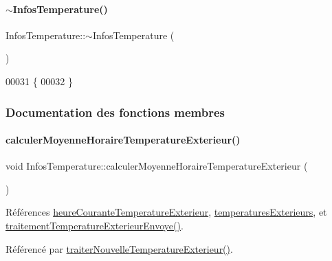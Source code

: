 \paragraph{\texorpdfstring{$\sim$\+Infos\+Temperature()}{~InfosTemperature()}}
{\footnotesize\ttfamily Infos\+Temperature\+::$\sim$\+Infos\+Temperature (\begin{DoxyParamCaption}{ }\end{DoxyParamCaption})}


\begin{DoxyCode}
00031 \{
00032 \}
\end{DoxyCode}


\subsubsection{Documentation des fonctions membres}
\mbox{\label{class_infos_temperature_a437325028225d765780b884614c47077}} 
\paragraph{\texorpdfstring{calculer\+Moyenne\+Horaire\+Temperature\+Exterieur()}{calculerMoyenneHoraireTemperatureExterieur()}}
{\footnotesize\ttfamily void Infos\+Temperature\+::calculer\+Moyenne\+Horaire\+Temperature\+Exterieur (\begin{DoxyParamCaption}{ }\end{DoxyParamCaption})\hspace{0.3cm}{\ttfamily [private]}}



Références \hyperlink{class_infos_temperature_a44edcf244175896e28798f252900f774}{heure\+Courante\+Temperature\+Exterieur}, \hyperlink{class_infos_temperature_a32b2a36e737ab4bf61fc8274990c2943}{temperatures\+Exterieurs}, et \hyperlink{class_infos_temperature_aaebee9d6151257fa1f182665d0fecf2c}{traitement\+Temperature\+Exterieur\+Envoye()}.



Référencé par \hyperlink{class_infos_temperature_ab8d95f48c31ca17c8690849562268420}{traiter\+Nouvelle\+Temperature\+Exterieur()}.


